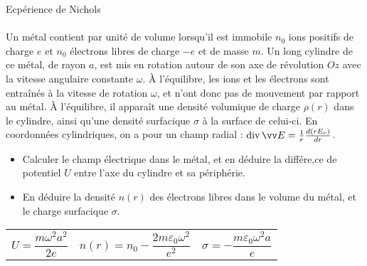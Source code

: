 \documentclass[french, a4paper, 11pt]{article}
\DeclareMathOperator{\diverg}{div}        %
\begin{document}
\begin{cadre}{Ecpérience de Nichols}
  \paragraph*{}
  Un métal contient par unité de volume lorsqu'il est immobile $n_{0}$ ions positifs de charge $e$ et $n_{0}$ électrons libres de charge $-e$ et de masse $m$. Un long cylindre de ce métal, de rayon $a$, est mis en rotation autour de son axe de révolution $Oz$ avec la vitesse angulaire constante $\omega$. À l'équilibre, les ions et les électrons sont entraînés à la vitesse de rotation $\omega$, et n'ont donc pas de mouvement par rapport au métal. À l'équilibre, il apparaît une densité volumique de charge $\rho(r)$ dans le cylindre, ainsi qu'une densité surfacique $\sigma$ à la surface de celui-ci. En coordonnées cylindriques, on a pour un champ radial : $\diverg \vv E = \frac{1}{r}\frac{d(rE_{r})}{dr}$.
  \begin{itemize}[label=$\bullet$]
    \item Calculer le champ électrique dans le métal, et en déduire la différe,ce de potentiel $U$ entre l'axe du cylindre et sa périphérie.
    \item En déduire la densité $n(r)$ des électrons libres dans le volume du métal, et le charge surfacique $\sigma$.
  \end{itemize}
  \tcblower
  \begin{tabularx}{\linewidth}{XXr}
    $U = \dfrac{m\omega^{2}a^{2}}{2e}$ &
    $n(r) = n_{0} - \dfrac{2m\varepsilon_{0}\omega^{2}}{e^{2}}$ &
    $\sigma = -\dfrac{m\varepsilon_{0}\omega^{2}a}{e}$
  \end{tabularx}
\end{cadre}
\end{document}
